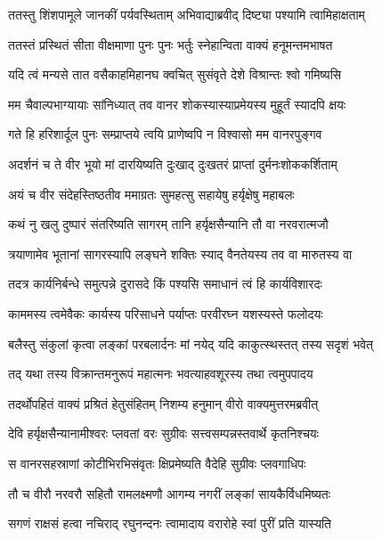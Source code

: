 
\twolineshloka
{ततस्तु शिंशपामूले जानकीं पर्यवस्थिताम्}
{अभिवाद्याब्रवीद् दिष्ट्या पश्यामि त्वामिहाक्षताम्} %

\twolineshloka
{ततस्तं प्रस्थितं सीता वीक्षमाणा पुनः पुनः}
{भर्तुः स्नेहान्विता वाक्यं हनूमन्तमभाषत} %

\twolineshloka
{यदि त्वं मन्यसे तात वसैकाहमिहानघ}
{क्वचित् सुसंवृते देशे विश्रान्तः श्वो गमिष्यसि} %

\twolineshloka
{मम चैवाल्पभाग्यायाः सांनिध्यात् तव वानर}
{शोकस्यास्याप्रमेयस्य मुहूर्तं स्यादपि क्षयः} %

\twolineshloka
{गते हि हरिशार्दूल पुनः सम्प्राप्तये त्वयि}
{प्राणेष्वपि न विश्वासो मम वानरपुङ्गव} %

\twolineshloka
{अदर्शनं च ते वीर भूयो मां दारयिष्यति}
{दुःखाद् दुःखतरं प्राप्तां दुर्मनःशोककर्शिताम्} %

\twolineshloka
{अयं च वीर संदेहस्तिष्ठतीव ममाग्रतः}
{सुमहत्सु सहायेषु हर्यृक्षेषु महाबलः} %

\twolineshloka
{कथं नु खलु दुष्पारं संतरिष्यति सागरम्}
{तानि हर्यृक्षसैन्यानि तौ वा नरवरात्मजौ} %

\twolineshloka
{त्रयाणामेव भूतानां सागरस्यापि लङ्घने}
{शक्तिः स्याद् वैनतेयस्य तव वा मारुतस्य वा} %

\twolineshloka
{तदत्र कार्यनिर्बन्धे समुत्पन्ने दुरासदे}
{किं पश्यसि समाधानं त्वं हि कार्यविशारदः} %

\twolineshloka
{काममस्य त्वमेवैकः कार्यस्य परिसाधने}
{पर्याप्तः परवीरघ्न यशस्यस्ते फलोदयः} %

\twolineshloka
{बलैस्तु संकुलां कृत्वा लङ्कां परबलार्दनः}
{मां नयेद् यदि काकुत्स्थस्तत् तस्य सदृशं भवेत्} %

\twolineshloka
{तद् यथा तस्य विक्रान्तमनुरूपं महात्मनः}
{भवत्याहवशूरस्य तथा त्वमुपपादय} %

\twolineshloka
{तदर्थोपहितं वाक्यं प्रश्रितं हेतुसंहितम्}
{निशम्य हनुमान् वीरो वाक्यमुत्तरमब्रवीत्} %

\twolineshloka
{देवि हर्यृक्षसैन्यानामीश्वरः प्लवतां वरः}
{सुग्रीवः सत्त्वसम्पन्नस्तवार्थे कृतनिश्चयः} %

\twolineshloka
{स वानरसहस्राणां कोटीभिरभिसंवृतः}
{क्षिप्रमेष्यति वैदेहि सुग्रीवः प्लवगाधिपः} %

\twolineshloka
{तौ च वीरौ नरवरौ सहितौ रामलक्ष्मणौ}
{आगम्य नगरीं लङ्कां सायकैर्विधमिष्यतः} %

\twolineshloka
{सगणं राक्षसं हत्वा नचिराद् रघुनन्दनः}
{त्वामादाय वरारोहे स्वां पुरीं प्रति यास्यति} %

